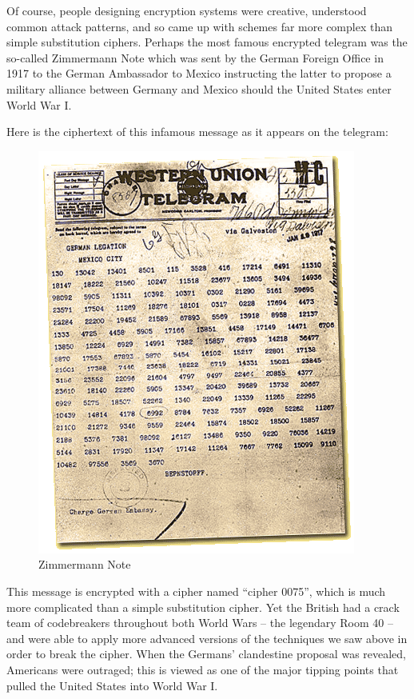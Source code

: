 \documentclass[UTF8]{book}
\begin{document}
\begin{CJK}{UTF8}{gbsn}
Of course, people designing encryption systems were creative, understood common attack patterns, and so came up with schemes far more complex than simple substitution ciphers. Perhaps the most famous encrypted telegram was the so-called Zimmermann Note which was sent by the German Foreign Office in 1917 to the German Ambassador to Mexico instructing the latter to propose a military alliance between Germany and Mexico should the United States enter World War I.

Here is the ciphertext of this infamous message as it appears on the telegram:

\begin{figure}[H]
\centering
\includegraphics[width=0.8\linewidth]{zimmermann}
\caption{Zimmermann Note}
\end{figure}

This message is encrypted with a cipher named ``cipher 0075'', which is much more complicated than a simple substitution cipher. Yet the British had a crack team of codebreakers throughout both World Wars -- the legendary Room 40 -- and were able to apply more advanced versions of the techniques we saw above in order to break the cipher. When the Germans' clandestine proposal was revealed, Americans were outraged; this is viewed as one of the major tipping points that pulled the United States into World War I.


\end{CJK}
\end{document}
